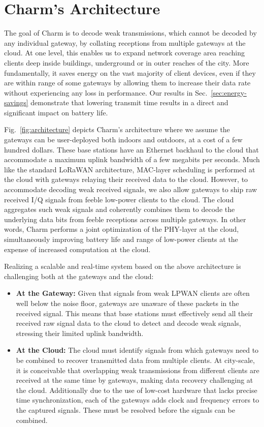 \section{Charm's Architecture}
\label{sec:arch}

The goal of Charm is to decode weak transmissions, which cannot be decoded
by any individual gateway, by collating receptions from multiple gateways at
the cloud. At one level, this  enables us to expand network coverage area
reaching clients deep inside buildings, underground or in outer reaches of the
city. More fundamentally, it saves energy on the vast majority of client
devices, even if they are within range of some gateways by allowing them to
increase their data rate without experiencing any loss in performance. Our
results in Sec.~\ref{sec:energy-savings} demonstrate that lowering transmit
time results in a direct and significant impact on battery life.

Fig.~\ref{fig:architecture} depicts Charm's architecture where we assume the
gateways can be user-deployed  both indoors and outdoors, at a cost of a few
hundred dollars. These base stations have an Ethernet backhaul to the cloud
that accommodate a maximum uplink bandwidth of a few megabits per seconds.
Much like the standard LoRaWAN architecture, MAC-layer scheduling is performed
at the cloud with gateways relaying their received data to the cloud. However,
to accommodate decoding weak received signals, we also allow gateways to ship
raw received I/Q signals from feeble low-power clients to the cloud. The cloud
aggregates such weak signals and coherently combines them to decode the
underlying data bits from feeble receptions across multiple gateways. In other
words, Charm performs a joint optimization of the  PHY-layer at the cloud,
simultaneously improving battery life and range of low-power clients at the
expense of increased computation at the cloud.

Realizing a scalable and real-time system based on the above architecture
is challenging both at the gateways and the cloud:
\begin{itemize}
\item {\bf At the Gateway: } Given that signals from weak LPWAN
clients are often well below the noise floor, gateways are unaware of these
packets in the received signal. This means that base stations must effectively
send all their received raw signal data to the cloud to detect and decode weak
signals, stressing their limited uplink bandwidth.
\item {\bf At the Cloud: } The cloud must identify signals from which
gateways need to be combined to recover transmitted data from multiple
clients. At city-scale, it is conceivable that overlapping weak transmissions
from different clients are received at the same time by gateways, making data
recovery challenging at the cloud. Additionally due to the use of low-cost
hardware that lacks precise time synchronization, each of the gateways adds
clock and frequency errors to the captured signals. These must be resolved
before the signals can be combined.
\end{itemize}

